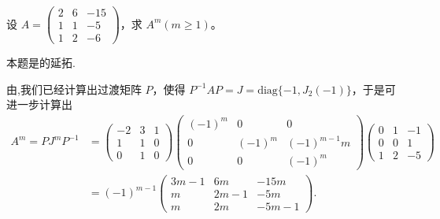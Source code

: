 \documentclass[../../main.tex]{subfiles}%
\begin{document}
\begin{example}
设 $A = \begin{pmatrix}
2 & 6 & -15 \\
1 & 1 & -5 \\
1 & 2 & -6
\end{pmatrix}$，求 $A^m (m \geqslant  1)$。
\end{example}
\begin{remark}
本题是的延拓.
\end{remark}
\begin{solution}

由,我们已经计算出过渡矩阵 $P$，使得 $P^{-1}AP = J = \mathrm{diag}\{-1, J_2(-1)\}$，于是可进一步计算出
\begin{align*}
A^m = PJ^mP^{-1} &= \begin{pmatrix}
-2 & 3 & 1 \\
1 & 1 & 0 \\
0 & 1 & 0
\end{pmatrix}
\begin{pmatrix}
(-1)^m & 0 & 0 \\
0 & (-1)^m & (-1)^{m - 1}m \\
0 & 0 & (-1)^m
\end{pmatrix}
\begin{pmatrix}
0 & 1 & -1 \\
0 & 0 & 1 \\
1 & 2 & -5
\end{pmatrix}\\
&= (-1)^{m - 1}
\begin{pmatrix}
3m - 1 & 6m & -15m \\
m & 2m - 1 & -5m \\
m & 2m & -5m - 1
\end{pmatrix}. 
\end{align*}

\end{solution}
\end{document}
